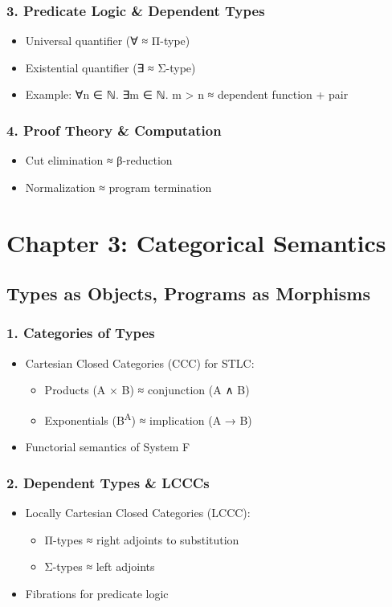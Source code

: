 \documentclass[11pt]{article}
\begin{document}
\subsubsection{3. Predicate Logic \& Dependent Types}
\label{sec:org98eacb9}
\begin{itemize}
\item Universal quantifier (∀ ≈ Π-type)
\item Existential quantifier (∃ ≈ Σ-type)
\item Example: ∀n ∈ ℕ. ∃m ∈ ℕ. m > n ≈ dependent function + pair
\end{itemize}

\subsubsection{4. Proof Theory \& Computation}
\label{sec:orgb856af5}
\begin{itemize}
\item Cut elimination ≈ β-reduction
\item Normalization ≈ program termination
\end{itemize}

\section{Chapter 3: Categorical Semantics}
\label{sec:org2cccdfa}
\subsection{Types as Objects, Programs as Morphisms}
\label{sec:orgdcacef9}
\subsubsection{1. Categories of Types}
\label{sec:orgb2cfa7f}
\begin{itemize}
\item Cartesian Closed Categories (CCC) for STLC:  
\begin{itemize}
\item Products (A × B) ≈ conjunction (A ∧ B)
\item Exponentials (B\textsuperscript{A}) ≈ implication (A → B)
\end{itemize}
\item Functorial semantics of System F
\end{itemize}

\subsubsection{2. Dependent Types \& LCCCs}
\label{sec:org8f40ca2}
\begin{itemize}
\item Locally Cartesian Closed Categories (LCCC):  
\begin{itemize}
\item Π-types ≈ right adjoints to substitution
\item Σ-types ≈ left adjoints
\end{itemize}
\item Fibrations for predicate logic
\end{itemize}
\end{document}
